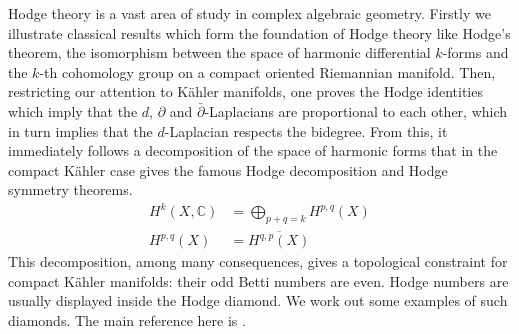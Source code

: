 \documentclass{article}
\newcommand{\CC}{\mathbb{C}}
\numberwithin{equation}{section}
\begin{document}
%
%

Hodge theory is a vast area of study in complex algebraic geometry. 
Firstly we illustrate classical results which form the foundation of Hodge theory like Hodge's theorem, the isomorphism between the space of harmonic differential $k$-forms and the $k$-th cohomology group on a compact oriented Riemannian manifold. Then, restricting our attention to K\"{a}hler manifolds, one proves the Hodge identities which imply that the $d$, $\partial$ and $\bar \partial$-Laplacians are proportional to each other, which in turn implies that the $d$-Laplacian respects the bidegree. From this, it immediately follows a decomposition of the space of harmonic forms that in the compact K\"{a}hler case gives the famous Hodge decomposition and Hodge symmetry theorems. 
\begin{align}
        H^k(X,\CC) &= \bigoplus_{p+q=k} H^{p,q}(X) \label{eq:eq1}\tag{Hodge Decomposition} \\
        H^{p,q}(X) &= \overline{H^{q,p}(X)} \label{eq:eq2}\tag{Hodge Symmetry}
\end{align}
This decomposition, among many consequences, gives a topological constraint for compact K\"{a}hler manifolds: their odd Betti numbers are even. Hodge numbers are usually displayed inside the Hodge diamond. We work out some examples of such diamonds. The main reference here is \cite{Voi07}.
\end{document}
